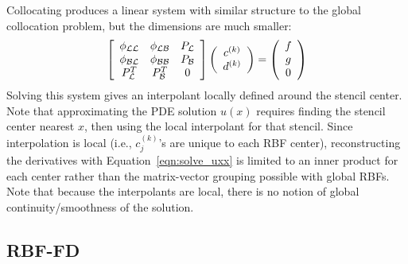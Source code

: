 \documentclass{report}
\begin{document}
{Collocating produces a linear system with similar structure to the global collocation problem, but the dimensions are much smaller:
\begin{eqnarray}
\left[ \begin{array}{c c c} 
	\phi_{\mathcal{L}\mathcal{L}} & \phi_{\mathcal{L}\mathcal{B}} & P_{\mathcal{L}} \\
	\phi_{\mathcal{B}\mathcal{L}} & \phi_{\mathcal{B}\mathcal{B}} & P_{\mathcal{B}} \\
	P^T_{\mathcal{L}} & P^T_{\mathcal{B}} & 0 \\
	\end{array} \right] \left( \begin{array}{c}
							{c}^{(k)} \\
							{d}^{(k)}
							 \end{array}
						 \right) = \left( \begin{array}{c}
							{f} \\
							{g} \\
							0
							 \end{array}
						 \right) 
	\label{eqn:local_method}
\end{eqnarray}
Solving this system gives an interpolant locally defined around the stencil center. Note that approximating the PDE solution $u(x)$ requires finding the stencil center nearest $x$, then using the local interpolant for that stencil. Since interpolation is local (i.e., $c_j^{(k)}$'s are unique to each RBF center), reconstructing the derivatives with Equation~\ref{eqn:solve_uxx} is limited to an inner product for each center rather than the matrix-vector grouping possible with global RBFs.  
Note that because the interpolants are local, there is no notion of global continuity/smoothness of the solution.


\subsection{RBF-FD}

}
\end{document}
